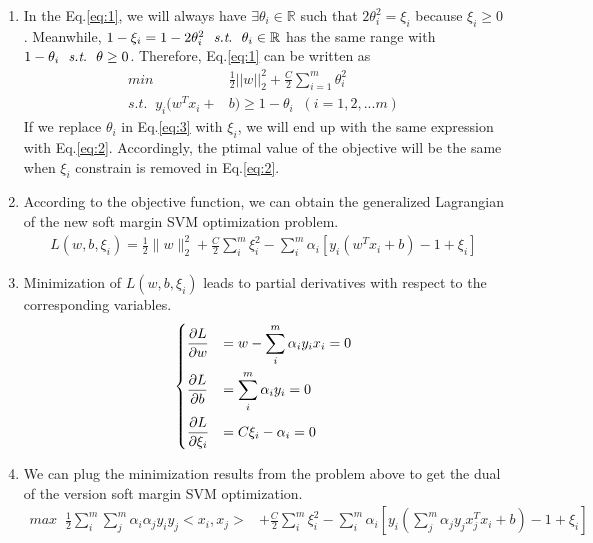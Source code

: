 \documentclass[11pt]{article}
\newcommand{\R}{\mathbb{R}}
\def \R {\mathbb{R}}
\begin{document}
	\begin{enumerate}
		\item
		In the Eq.\ref{eq:1}, we will always have $\exists \theta_i\in\R$ such that $2\theta_i^2=\xi_i$ because $\xi_i\geq0$. Meanwhile, $1-\xi_i=1-2\theta^2_i \ \ \st \ \ \theta_i \in \R$ has the same range with $1-\theta_i \ \ \st \ \ \theta \geq 0$. Therefore, Eq.\ref{eq:1} can be written as
		\begin{equation}\label{eq:3}
			\begin{aligned}
				min\;\; &\frac{1}{2}||w||_2^2 +\frac{C}{2}\sum\limits_{i=1}^{m}\theta_i^2\\s.t.  \;\; y_i(w^Tx_i + &b)  \geq 1 - \theta_i \;\;(i =1,2,...m)
			\end{aligned}
		\end{equation}
		If we replace $\theta_i$ in Eq.\ref{eq:3} with $\xi_i$, we will end up with the same expression with Eq.\ref{eq:2}. Accordingly, the ptimal value of the objective will be the same when $\xi_i$ constrain is removed in Eq.\ref{eq:2}.
		\item
		According to the objective function, we can obtain the generalized Lagrangian of the new soft margin SVM optimization problem.
		\begin{equation}\label{eq:4}
			\begin{aligned}
				L(w,b,\xi_i)=\frac{1}{2}\|w\|^2_2+\frac{C}{2}\sum_{i}^{m}\xi_i^2-\sum_{i}^{m}\alpha_i\left[y_i\left(w^Tx_i+b\right)-1+\xi_i\right]
			\end{aligned}
		\end{equation} 
		\item Minimization of $L(w,b,\xi_i)$ leads to partial derivatives with respect to the corresponding variables.   
		\[
		\begin{dcases}
			\frac{\partial L}{\partial w}&=w-\sum_{i}^{m}\alpha_iy_ix_i=0\\
			\frac{\partial L}{\partial b}&=\sum_{i}^{m}\alpha_iy_i=0\\
			\frac{\partial L}{\partial \xi_i}&=C\xi_i-\alpha_i=0\\
		\end{dcases}
		\]
		\item
		We can plug the minimization results from the problem above to get the dual of the version soft margin SVM optimization.\\
		\begin{equation}\label{eq:5}
			\begin{aligned}
				max\;\; \frac{1}{2}\sum_{i}^{m}\sum_{j}^{m}\alpha_i\alpha_jy_iy_j<x_i,x_j>&+\frac{C}{2}\sum_{i}^{m}\xi_i^2-	\sum_{i}^{m}\alpha_i\left[y_i\left(\sum_{j}^{m}\alpha_jy_jx_j^Tx_i+b\right)-1+\xi_i\right] \\

\end{aligned}
\end{equation}
\end{enumerate}
\end{document}
